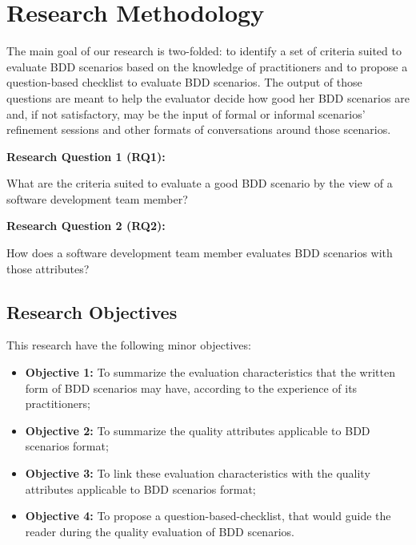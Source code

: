 \chapter{\label{chap:chap3}{Research Methodology}}

The main goal of our research is two-folded: to identify a set of criteria suited to evaluate BDD scenarios based on the knowledge of practitioners and to propose a question-based checklist to evaluate BDD scenarios. The output of those questions are meant to help the evaluator decide how good her BDD scenarios are and, if not satisfactory, may be the input of formal or informal scenarios' refinement sessions and other formats of conversations around those scenarios.

\begin{framed}

\indent \textbf{Research Question 1 (RQ1):}

What are the criteria suited to evaluate a good BDD scenario by the view of a software development team member?

\indent \textbf{Research Question 2 (RQ2):}

How does a software development team member evaluates BDD scenarios with those attributes?

\end{framed}

\section{Research Objectives}

This research have the following minor objectives:

\begin{itemize}
    \item \textbf{Objective 1:} To summarize the evaluation characteristics that the written form of BDD scenarios may have, according to the experience of its practitioners;
    \item \textbf{Objective 2:} To summarize the quality attributes applicable to BDD scenarios format;
    \item \textbf{Objective 3:} To link these evaluation characteristics with the quality attributes applicable to BDD scenarios format;
    \item \textbf{Objective 4:} To propose a question-based-checklist, that would guide the reader during the quality evaluation of BDD scenarios.
\end{itemize}

